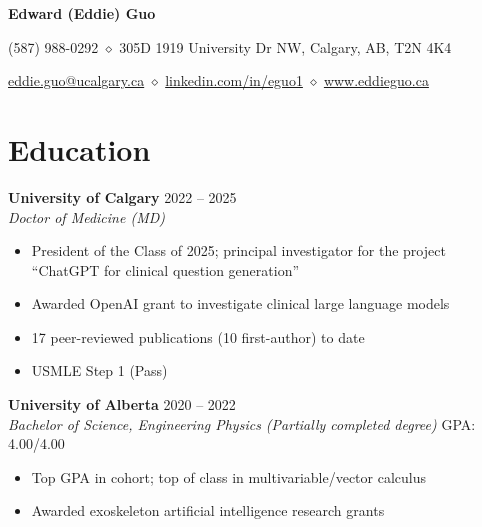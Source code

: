\documentclass{article}
\begin{document}
\thispagestyle{plain}
\begin{center}
\LARGE \textbf{\textcolor{my_colour}{Edward (Eddie) Guo}} \vspace{.2em}

\normalfont \normalsize
(587) 988-0292 \hspace{.15em} $\diamond$ \hspace{.15em} 305D 1919 University Dr NW, Calgary, AB, T2N 4K4

\href{mailto:eddie.guo@ucalgary.ca}{eddie.guo@ucalgary.ca}
    \hspace{.15em} $\diamond$ \hspace{.15em}
\href{https://www.linkedin.com/in/eguo1}{linkedin.com/in/eguo1}
    \hspace{.15em} $\diamond$ \hspace{.15em}
\href{https://eddieguo.ca}{www.eddieguo.ca}
\end{center}

\vspace{-1em}


\section*{\textcolor{my_colour}{Education}}
\vspace{-.25em} \hrulefill \vspace{.25em}

\textbf{University of Calgary} \hfill 2022 -- 2025 \\
\textit{Doctor of Medicine (MD)}
\begin{itemize}
    \item President of the Class of 2025; principal investigator for the project ``ChatGPT for clinical question generation''
    \item Awarded OpenAI grant to investigate clinical large language models
    \item 17 peer-reviewed publications (10 first-author) to date
    \item USMLE Step 1 (Pass)
\end{itemize} \vspace{1em}

\textbf{University of Alberta} \hfill 2020 -- 2022 \\
\textit{Bachelor of Science, Engineering Physics (Partially completed degree)} \hfill GPA: 4.00/4.00
\begin{itemize}
    \item Top GPA in cohort; top of class in multivariable/vector calculus
    \item Awarded exoskeleton artificial intelligence research grants
\end{itemize} \vspace{1em}
\end{document}
